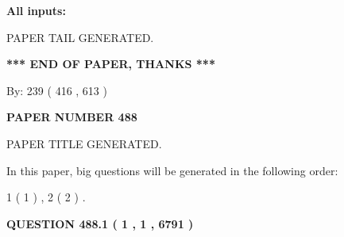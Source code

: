 \documentclass[12pt]{article}
\begin{document}
   
   
   
\noindent{}
   
   
   
   
\noindent\vspace{0.1in}\hspace{-0.08in} {\textbf{\Large{All inputs: }}}
   
   
   
   
   
   
 \vspace{0.2in}
 
   
   
\vspace{2.0in} PAPER TAIL GENERATED.
   
   
   
   
\vspace{1.0in} 
{\textbf{\large{ *** END OF PAPER, THANKS *** }}} 
   
   
\hspace{1.0in} By: 
 239 ( 416 ,  613 )
   
   
   
   
\newpage 
\setcounter{page}{ 
   488001 } 
   
   
   
   
 {\textbf{ \Large{ PAPER NUMBER  488  }}}
   
   
\vspace{0.2in}
   
   
   
   
   
   
   
   
 \vspace{0.2in}
 
 
 
 
   
   
 PAPER TITLE GENERATED.
   
   
   
\vspace{0.2in}
   
In this paper, big questions will be generated in the following order: 
   
   
   1 ( 1 )
 ,
   2 ( 2 )
 .
  
\vspace{0.2in}
  
{\textbf{\Large{QUESTION
488.1 
 ( 1 , 1 , 6791 )
}}}
  
\end{document}
